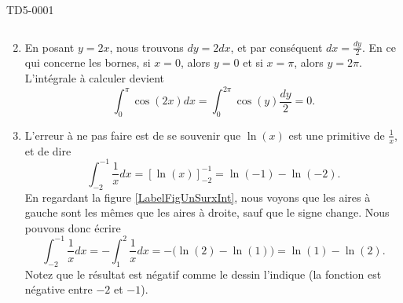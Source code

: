 \begin{corrige}{TD5-0001}
\begin{enumerate}
\begin{equation}
			\end{equation}
		\item
			En posant $y=2x$, nous trouvons $dy=2dx$, et par conséquent $dx=\frac{ dy }{2}$. En ce qui concerne les bornes, si $x=0$, alors $y=0$ et si $x=\pi$, alors $y=2\pi$. L'intégrale à calculer devient
			\begin{equation}
				\int_0^{\pi}\cos(2x)dx=\int_0^{2\pi}\cos(y)\frac{ dy }{ 2 }=0.
			\end{equation}
		\item
			\newcommand{\CaptionFigUnSurxInt}{La surface achurée à gauche est la même que la surface achurée à droite. Seul le signe change lorsqu'on veut calculer l'intégrale.}
			
			L'erreur à ne pas faire est de se souvenir que $\ln(x)$ est une primitive de $\frac{1}{ x }$, et de dire
			\begin{equation}
				\int_{-2}^{-1}\frac{1}{ x }dx=\left[ \ln(x) \right]_{-2}^{-1}=\ln(-1)-\ln(-2).
			\end{equation}
			En regardant la figure \ref{LabelFigUnSurxInt}, nous voyons que les aires à gauche sont les mêmes que les aires à droite, sauf que le signe change. Nous pouvons donc écrire
			\begin{equation}
				\int_{-2}^{-1}\frac{1}{ x }dx=-\int_1^2\frac{1}{ x }dx=-\Big( \ln(2)-\ln(1) \Big)=\ln(1)-\ln(2).
			\end{equation}
			Notez que le résultat est négatif comme le dessin l'indique (la fonction est négative entre $-2$ et $-1$).


\end{enumerate}
\end{corrige}
